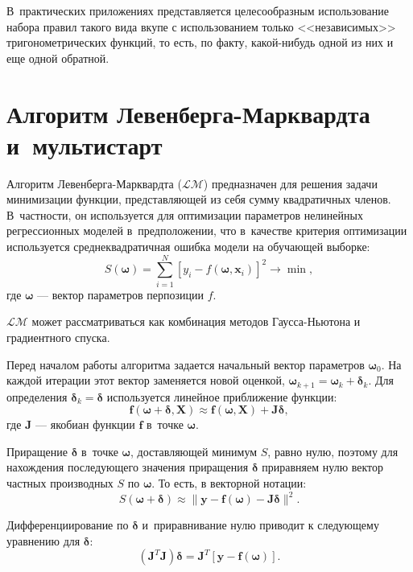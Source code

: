 \documentclass[12pt,a4paper]{amsart}
\begin{document}
В~практических приложениях представляется целесообразным использование
набора правил такого вида вкупе с использованием только <<независимых>>
тригонометрических функций, то есть, по факту, какой-нибудь одной из них
и еще одной обратной.

\section{Алгоритм Левенберга-Марквардта и~мультистарт}

Алгоритм Левенберга-Марквардта ($\mathcal{LM}$) \cite{Marquardt1963Algorithm, more:78}
предназначен для решения задачи минимизации функции, представляющей из себя
сумму квадратичных членов. В~частности, он используется для оптимизации
параметров нелинейных регрессионных моделей в~предположении, что в~качестве
критерия оптимизации используется среднеквадратичная ошибка модели на
обучающей выборке:
\[
S(\boldsymbol{\omega}) = \sum_{i=1}^{N} [y_i - f(\boldsymbol{\omega}, \mathbf{x}_i)]^2 \to \min,
\]
где $\boldsymbol{\omega}$ --- вектор параметров перпозиции $f$.

$\mathcal{LM}$ может рассматриваться как комбинация методов Гаусса-Ньютона и
градиентного спуска.

Перед началом работы алгоритма задается начальный вектор параметров $\boldsymbol{\omega}_0$.
На каждой итерации этот вектор заменяется новой оценкой,
$\boldsymbol{\omega}_{k+1} = \boldsymbol{\omega}_k + \boldsymbol{\delta}_k$.
Для определения $\boldsymbol{\delta}_k = \boldsymbol{\delta}$ используется линейное приближение функции:
\[
\mathbf{f(\boldsymbol{\omega} + \boldsymbol{\delta}, X)} \approx
	\mathbf{f(\boldsymbol{\omega}, X)} + \mathbf{J} \boldsymbol{\delta},
\]
где $\mathbf{J}$ --- якобиан функции $\mathbf{f}$ в~точке $\boldsymbol{\omega}$.

Приращение $\boldsymbol{\delta}$ в~точке $\boldsymbol{\omega}$, доставляющей минимум $S$,
равно нулю, поэтому для нахождения последующего значения приращения $\boldsymbol{\delta}$
приравняем нулю вектор частных производных $S$ по $\boldsymbol{\omega}$. То есть,
в векторной нотации:
\[
S(\mathbf{\boldsymbol{\omega} + \boldsymbol{\delta}}) \approx \| \mathbf{y - f (\boldsymbol{\omega}) - J\boldsymbol{\delta}} \|^2.
\]

Дифференциирование по $\boldsymbol{\delta}$ и~приравнивание нулю приводит к
следующему уравнению для $\boldsymbol{\delta}$:
\[
(\mathbf{J}^T\mathbf{J})\boldsymbol{\delta} = \mathbf{J}^T [\mathbf{y - f(\boldsymbol{\omega})}].
\]
\end{document}
